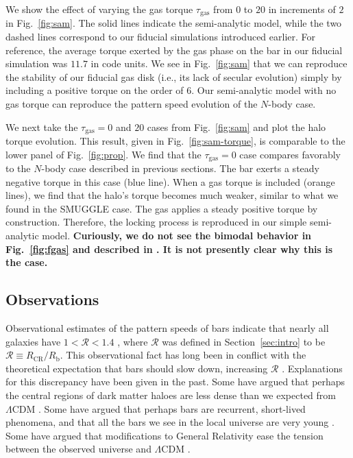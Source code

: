 \documentclass[twocolumn,linenumbers,trackchanges]{aastex631}
\newcommand{\RCR}{\ensuremath{R_{\textrm{CR}}}}
\newcommand{\Rot}{\ensuremath{\mathcal{R}}}
\newcommand{\Rb}{\ensuremath{R_{\textrm{b}}}}
\newcommand{\Nbody}{$N$-body}
\newcommand{\SMUGGLE}{SMUGGLE}
\begin{document}
We show the effect of varying the gas torque $\tau_{\textrm{gas}}$ from $0$ to
$20$ in increments of $2$ in Fig.~\ref{fig:sam}. The solid lines indicate the
semi-analytic model, while the two dashed lines correspond to our fiducial
simulations introduced earlier. For reference, the average torque exerted by the
gas phase on the bar in our fiducial simulation was $11.7$ in code units. We see
in Fig.~\ref{fig:sam} that we can reproduce the stability of our fiducial gas
disk (i.e., its lack of secular evolution) simply by including a positive torque
on the order of $6$. Our semi-analytic model with no gas torque can reproduce
the pattern speed evolution of the $N$-body case.

We next take the $\tau_{\textrm{gas}}=0$ and $20$ cases from Fig.~\ref{fig:sam}
and plot the halo torque evolution. This result, given in
Fig.~\ref{fig:sam-torque}, is comparable to the lower panel of
Fig.~\ref{fig:prop}. We find that the $\tau_{\textrm{gas}}=0$ case compares
favorably to the \Nbody{} case described in previous sections. The bar exerts a
steady negative torque in this case (blue line). When a gas torque is included
(orange lines), we find that the halo's torque becomes much weaker, similar to
what we found in the \SMUGGLE{} case. The gas applies a steady positive torque
by construction. Therefore, the locking process is reproduced in our simple
semi-analytic model. {\bf Curiously, we do not see the bimodal behavior in
Fig.~\ref{fig:fgas} and described in \citet{2010ApJ...719.1470V}. It is not
presently clear why this is the case.}

\subsection{Observations}
\label{ssec:observations}
Observational estimates of the pattern speeds of bars indicate that nearly all
galaxies have $1 < \Rot < 1.4$ \citep{2011MSAIS..18...23C, 2015AA...576A.102A,
2019MNRAS.482.1733G, 2020MNRAS.491.3655G}, where $\Rot$ was defined in
Section~\ref{sec:intro} to be $\Rot\equiv \RCR/\Rb$. This observational fact has
long been in conflict with the theoretical expectation that bars should slow
down, increasing \Rot{} \citep[e.g.][]{1984MNRAS.209..729T, 1985MNRAS.213..451W,
2000ApJ...543..704D}. Explanations for this discrepancy have been given in the
past. Some have argued that perhaps the central regions of dark matter haloes
are less dense than we expected from $\Lambda\textrm{CDM}$
\citep[e.g.][]{2000ApJ...543..704D,2021AA...650L..16F}. Some have argued that
perhaps bars are recurrent, short-lived phenomena, and that all the bars we see
in the local universe are very young \citep{2002AA...392...83B,
2005MNRAS.364L..18B}. Some have argued that modifications to General Relativity
ease the tension between the observed universe and $\Lambda\textrm{CDM}$
\citep[e.g.][]{2021MNRAS.503.2833R, 2021MNRAS.508..926R}.
\end{document}
